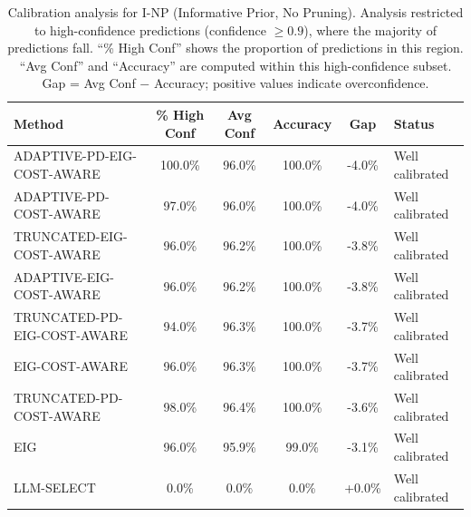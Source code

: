 \begin{table}[htbp]
\centering
\small
\caption{Calibration analysis for I-NP (Informative Prior, No Pruning). Analysis restricted to high-confidence predictions (confidence $\geq 0.9$), where the majority of predictions fall. ``\% High Conf'' shows the proportion of predictions in this region. ``Avg Conf'' and ``Accuracy'' are computed within this high-confidence subset. Gap = Avg Conf $-$ Accuracy; positive values indicate overconfidence.}
\label{tab:calibration-notprune_notuniform}
\begin{tabular}{@{}lccccl@{}}
\toprule
Method & \% High Conf & Avg Conf & Accuracy & Gap & Status \\
\midrule
ADAPTIVE-PD-EIG-COST-AWARE & 100.0\% & 96.0\% & 100.0\% & -4.0\% & Well calibrated \\
ADAPTIVE-PD-COST-AWARE & 97.0\% & 96.0\% & 100.0\% & -4.0\% & Well calibrated \\
TRUNCATED-EIG-COST-AWARE & 96.0\% & 96.2\% & 100.0\% & -3.8\% & Well calibrated \\
ADAPTIVE-EIG-COST-AWARE & 96.0\% & 96.2\% & 100.0\% & -3.8\% & Well calibrated \\
TRUNCATED-PD-EIG-COST-AWARE & 94.0\% & 96.3\% & 100.0\% & -3.7\% & Well calibrated \\
EIG-COST-AWARE & 96.0\% & 96.3\% & 100.0\% & -3.7\% & Well calibrated \\
TRUNCATED-PD-COST-AWARE & 98.0\% & 96.4\% & 100.0\% & -3.6\% & Well calibrated \\
EIG & 96.0\% & 95.9\% & 99.0\% & -3.1\% & Well calibrated \\
LLM-SELECT & 0.0\% & 0.0\% & 0.0\% & +0.0\% & Well calibrated \\
\bottomrule
\end{tabular}
\end{table}